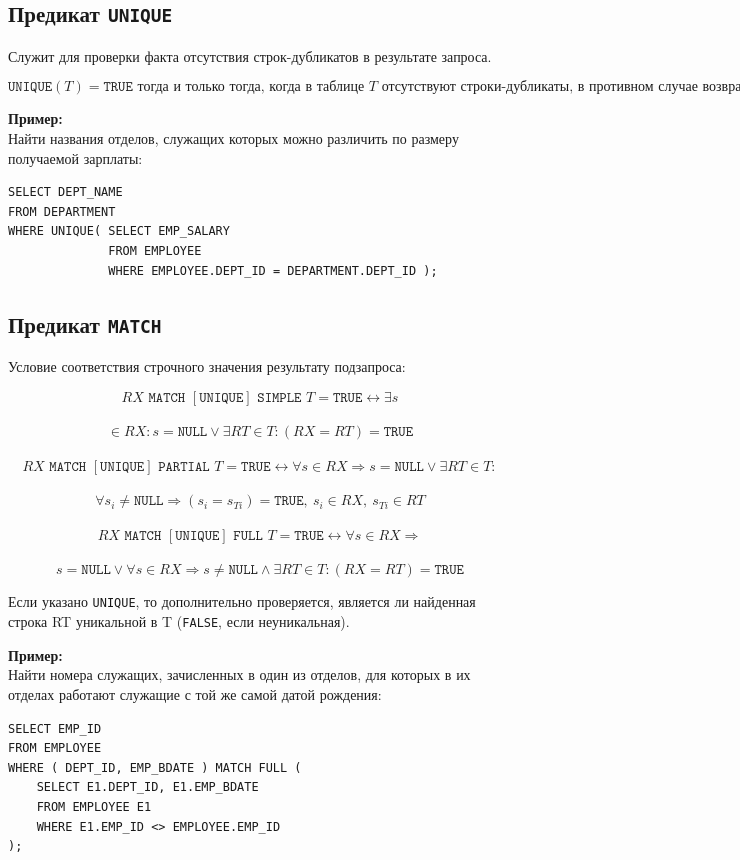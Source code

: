 \documentclass[a4paper,12pt]{article}
\begin{document}
\subsection{Предикат \texttt{UNIQUE}}

Служит для проверки факта отсутствия строк-дубликатов в результате запроса.

\[
\texttt{UNIQUE}(T) = \texttt{TRUE} \text{ тогда и только тогда, когда в таблице } T \text{ отсутствуют строки-дубликаты, в противном случае возвращается } \texttt{FALSE}.
\]

\textbf{Пример:}\\
Найти названия отделов, служащих которых можно различить по размеру получаемой зарплаты:
\begin{lstlisting}
SELECT DEPT_NAME 
FROM DEPARTMENT 
WHERE UNIQUE( SELECT EMP_SALARY 
              FROM EMPLOYEE 
              WHERE EMPLOYEE.DEPT_ID = DEPARTMENT.DEPT_ID );
\end{lstlisting}

\subsection{Предикат \texttt{MATCH}}

Условие соответствия строчного значения результату подзапроса:

\[
RX \texttt{ MATCH } [\texttt{UNIQUE}] \texttt{ SIMPLE } T = \texttt{TRUE} \leftrightarrow \exists s \] \ \[ \in RX : s = \texttt{NULL} \lor \exists RT \in T : (RX = RT) = \texttt{TRUE}
\]
\\
\[
RX \texttt{ MATCH } [\texttt{UNIQUE}] \texttt{ PARTIAL } T = \texttt{TRUE} \leftrightarrow \forall s \in RX \Rightarrow s = \texttt{NULL} \lor \exists RT \in T : \] \ \[\forall s_i \neq \texttt{NULL} \Rightarrow (s_i = s_{Ti}) = \texttt{TRUE},\ s_i \in RX,\ s_{Ti} \in RT
\]
\\
\[
RX \texttt{ MATCH } [\texttt{UNIQUE}] \texttt{ FULL } T = \texttt{TRUE} \leftrightarrow \forall s \in RX \Rightarrow \] \ \[ s = \texttt{NULL} \lor \forall s \in RX \Rightarrow s \neq \texttt{NULL} \land \exists RT \in T : (RX = RT) = \texttt{TRUE}
\]

Если указано \texttt{UNIQUE}, то дополнительно проверяется, является ли найденная строка RT уникальной в T (\texttt{FALSE}, если неуникальная).

\textbf{Пример:}\\
Найти номера служащих, зачисленных в один из отделов, для которых в их отделах работают служащие с той же самой датой рождения:
\begin{lstlisting}
SELECT EMP_ID 
FROM EMPLOYEE 
WHERE ( DEPT_ID, EMP_BDATE ) MATCH FULL (
    SELECT E1.DEPT_ID, E1.EMP_BDATE 
    FROM EMPLOYEE E1 
    WHERE E1.EMP_ID <> EMPLOYEE.EMP_ID
);
\end{lstlisting}
\end{document}
